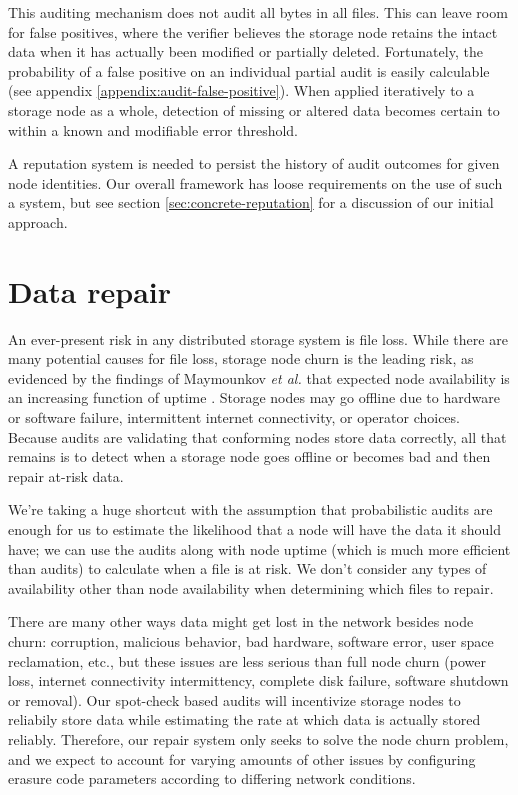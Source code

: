 \documentclass[11pt,fleqn,openany]{book}
\begin{document}
This auditing mechanism does not audit all bytes in all files. This can
leave room for false positives, where the verifier believes the storage node
retains the intact data when it has actually been modified or partially
deleted. Fortunately, the probability of a false positive on an individual
partial audit is easily calculable (see appendix
\ref{appendix:audit-false-positive}). When applied
iteratively to a storage node as a whole, detection of missing or altered data
becomes certain to within a known and modifiable error threshold.

A reputation system is needed to persist the history of audit outcomes for
given node identities. Our overall framework has loose requirements on the use
of such a system, but see section \ref{sec:concrete-reputation} for a
discussion of our initial approach.

\section{Data repair}

An ever-present risk in any distributed storage system is file loss. While there
are many potential causes for file loss, storage node churn is the leading
risk, as evidenced by the findings of Maymounkov {\em et al.} that expected node
availability is an increasing function of uptime \cite{kad}. Storage nodes
may go offline due to hardware or software failure, intermittent internet
connectivity, or operator choices.
Because audits are validating that conforming nodes store data correctly, all
that remains is to detect when a storage node goes offline or becomes bad and
then repair at-risk data.

We're taking a huge shortcut with the assumption that
probabilistic audits are enough for us to estimate the likelihood that a node
will have the data it should have; we can use the audits
along with node uptime (which is much more efficient than audits)
to calculate when a file is at risk.
We don't consider any types of availability other than node availability when
determining which files to repair.

There are many other ways data might get lost in the network besides node churn:
corruption, malicious behavior, bad hardware, software error, user space
reclamation, etc., but these issues are less serious than full node
churn (power loss, internet connectivity intermittency, complete disk failure,
software shutdown or removal).
Our spot-check based audits will incentivize storage nodes to reliabily store
data
while estimating the rate at which data is actually stored reliably.
Therefore, our repair system only seeks to solve the node churn problem, and
we expect to account for varying
amounts of other issues by configuring erasure code
parameters according to differing network conditions.
\end{document}
